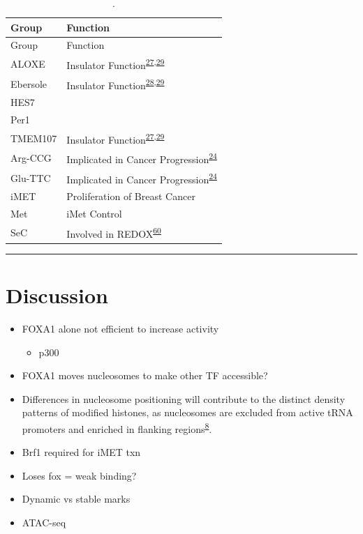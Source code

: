 \documentclass[
  12pt,
]{article}
\providecommand{\tightlist}{%
  \setlength{\itemsep}{0pt}\setlength{\parskip}{0pt}}
\begin{document}
\begin{longtable}[]{@{}ll@{}}
\caption{\label{tab:clusters}.}\tabularnewline
\toprule()
Group & Function \\
\midrule()
\endfirsthead
\toprule()
Group & Function \\
\midrule()
\endhead
ALOXE & Insulator Function\textsuperscript{\protect\hyperlink{ref-raab2011}{27},\protect\hyperlink{ref-sizer2022}{29}} \\
Ebersole & Insulator Function\textsuperscript{\protect\hyperlink{ref-Ebersole2011}{28},\protect\hyperlink{ref-sizer2022}{29}} \\
HES7 & \\
Per1 & \\
TMEM107 & Insulator Function\textsuperscript{\protect\hyperlink{ref-raab2011}{27},\protect\hyperlink{ref-sizer2022}{29}} \\
Arg-CCG & Implicated in Cancer Progression\textsuperscript{\protect\hyperlink{ref-Goodarzi2016}{24}} \\
Glu-TTC & Implicated in Cancer Progression\textsuperscript{\protect\hyperlink{ref-Goodarzi2016}{24}} \\
iMET & Proliferation of Breast Cancer \\
Met & iMet Control \\
SeC & Involved in REDOX\textsuperscript{\protect\hyperlink{ref-Sangha2022}{60}} \\
\bottomrule()
\end{longtable}

\begin{center}\rule{0.5\linewidth}{0.5pt}\end{center}

\hypertarget{discussion}{%
\section{Discussion}\label{discussion}}

\begin{itemize}
\item
  FOXA1 alone not efficient to increase activity

  \begin{itemize}
  \tightlist
  \item
    p300
  \end{itemize}
\item
  FOXA1 moves nucleosomes to make other TF accessible?
\item
  Differences in nucleosome positioning will contribute to the distinct density patterns of modified histones, as nucleosomes are excluded from active tRNA promoters and enriched in flanking regions\textsuperscript{\href{https://www.nature.com/articles/nrg3001\#ref-CR8}{8}}.
\item
  Brf1 required for iMET txn
\item
  Loses fox = weak binding?
\item
  Dynamic vs stable marks
\item
  ATAC-seq
\end{itemize}
\end{document}
